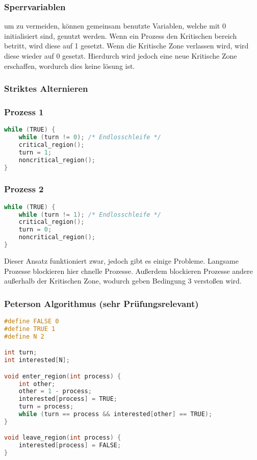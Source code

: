 \subsubsection{Sperrvariablen}

um  zu vermeiden, können gemeinsam benutzte Variablen,
welche mit 0 initialisiert sind, genutzt werden. Wenn ein Prozess den
Kritischen bereich betritt, wird diese auf 1 gesetzt. Wenn die Kritische Zone
verlassen wird, wird diese wieder auf 0 gesetzt. Hierdurch wird jedoch eine
neue Kritische Zone erschaffen, wordurch dies keine lösung ist.

\subsubsection{Striktes Alternieren}

\subsubsection*{Prozess 1}

\begin{lstlisting}[language=C]
while (TRUE) {
    while (turn != 0); /* Endlosschleife */
    critical_region();
    turn = 1;
    noncritical_region();
} 
\end{lstlisting}

\subsubsection*{Prozess 2}

\begin{lstlisting}[language=C]
while (TRUE) {
    while (turn != 1); /* Endlosschleife */
    critical_region();
    turn = 0;
    noncritical_region();
} 
\end{lstlisting}

Dieser Ansatz funktioniert zwar, jedoch gibt es einige Probleme. Langsame
Prozesse blockieren hier chnelle Prozesse. Außerdem blockieren Prozesse andere
außerhalb der Kritischen Zone, wodurch geben Bedingung 3 verstoßen wird.

\subsubsection{Peterson Algorithmus (sehr Prüfungsrelevant)}

\begin{lstlisting}[language=C]
#define FALSE 0
#define TRUE 1
#define N 2

int turn;
int interested[N];

void enter_region(int process) {
    int other;
    other = 1 - process;
    interested[process] = TRUE;
    turn = process;
    while (turn == process && interested[other] == TRUE);
} 

void leave_region(int process) {
    interested[process] = FALSE;
} 
\end{lstlisting}

